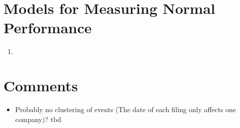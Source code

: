 \documentclass[12pt]{article}
\begin{document}
\section{Models for Measuring Normal Performance}
\begin{enumerate}
	\item 
\end{enumerate}

\section{Comments}

\begin{itemize}
	\item Probably no clustering of events (The date of each filing only affects one company)? tbd
\end{itemize}
\end{document}
